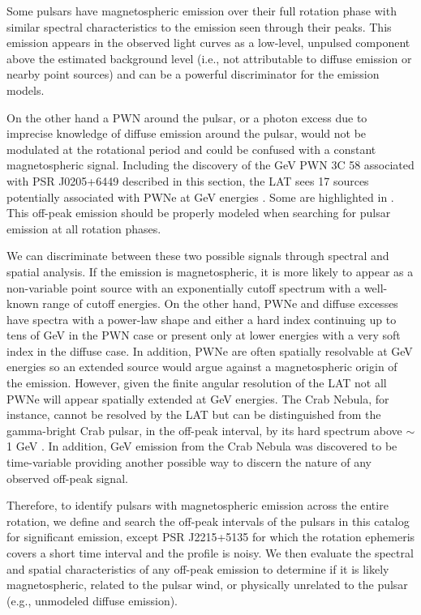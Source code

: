 Some pulsars have magnetospheric emission over their full rotation phase
with similar spectral characteristics to the emission seen through
their peaks.  This emission appears in the observed light curves as
a low-level, unpulsed component above the estimated background level
(i.e., not attributable to diffuse emission or nearby point sources)
and can be a powerful discriminator for the emission models.

On the other hand a PWN around the pulsar, or a photon excess due
to imprecise knowledge of diffuse emission around the pulsar, would
not be modulated at the rotational period and could be confused with
a constant magnetospheric signal.  Including the discovery of the GeV
PWN 3C 58 associated with PSR J0205+6449 described in this section, the
LAT sees 17 sources potentially associated with PWNe at GeV energies
\citep{acero_2013a_constraints-galactic}.  Some are highlighted in
.  This off-peak
emission should be properly modeled when searching for pulsar emission
at all rotation phases.

We can discriminate between these two possible signals through
spectral and spatial analysis.  If the emission is magnetospheric,
it is more likely to appear as a non-variable point source with
an exponentially cutoff spectrum with a well-known range of cutoff
energies.  On the other hand, PWNe and diffuse excesses have spectra
with a power-law shape and either a hard index continuing up to tens
of GeV in the PWN case or present only at lower energies with a very
soft index in the diffuse case.  In addition, PWNe are often spatially
resolvable at GeV energies \citep[e.g., Vela-X has been spatially
resolved with the LAT and \textit{AGILE} and HESS J1825$-$137 with the
LAT;][respectively]{abdo_2010c_fermi-large,pellizzoni_2010a_detection-gamma-ray,grondin_2011a_detection-pulsar}
so an extended source would argue against a magnetospheric origin
of the emission.  However, given the finite angular resolution
of the LAT not all PWNe will appear
spatially extended at GeV energies.  The Crab Nebula, for instance,
cannot be resolved by the LAT but can be distinguished from the
gamma-bright Crab pulsar, in the off-peak interval, by its hard
spectrum above $\sim$1 GeV \citep{abdo_2010a_fermi-large}.  In addition, GeV
emission from the Crab Nebula was discovered to be time-variable
\citep[e.g.,][]{abdo_2011a_gamma-ray-flares} providing another
possible way to discern the nature of any observed off-peak signal.


Therefore, to identify pulsars with magnetospheric emission across
the entire rotation, we define and search the off-peak intervals
of the pulsars in this catalog for significant emission, except PSR
J2215+5135 for which the rotation ephemeris covers a short time interval
and the profile is noisy.  We then evaluate the spectral and spatial
characteristics of any off-peak emission to determine if it is likely
magnetospheric, related to the pulsar wind, or physically unrelated to
the pulsar (e.g., unmodeled diffuse emission).
